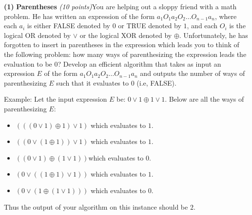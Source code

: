 \documentclass[12pt]{article}
\def\bigap{0.25in}
\begin{document}
\setlength{\parindent}{0in}
\addtolength{\parskip}{0.1cm}
\setlength{\fboxrule}{.5mm}\setlength{\fboxsep}{1.2mm}
\newlength{\boxlength}\setlength{\boxlength}{\textwidth}
\addtolength{\boxlength}{-4mm}
\begin{center}
\end{center}
\vspace{5mm}
\vskip \bigap
{\bf (1)}  \textbf{Parentheses}  {\em (10 points)}\newline You are helping out a sloppy friend with a math problem. He has written an expression of the form $a_1 O_1 a_2 O_2 \ldots O_{n-1} a_n$, where each $a_i$ is either FALSE denoted by $0$ or TRUE denoted by $1$, and each $O_i$ is the logical OR denoted by $\lor$ or  the logical XOR denoted by $\oplus$.  Unfortunately, he has forgotten to insert in parentheses in the expression which leads you to think of the following problem: how many ways of parenthesizing the expression leads the evaluation to be $0$? Develop an efficient algorithm that takes as input an expression $E$ of the form  $a_1 O_1 a_2 O_2 \ldots O_{n-1} a_n$  and outputs the number of ways of parenthesizing $E$ such that it evaluates to $0$ (i.e, FALSE).

Example: Let the input expression $E$ be: $0 \lor 1 \oplus 1 \lor 1$. Below are all the ways of parenthesizing $E$:
\begin{itemize}
 \item $(((0 \lor 1) \oplus 1) \lor 1)$ which evaluates to $1$.
  \item $((0 \lor (1 \oplus 1)) \lor 1)$ which evaluates to $1$.
 \item  $((0 \lor 1) \oplus (1 \lor 1))$which evaluates to $0$.
 \item $(0 \lor ((1 \oplus 1) \lor 1))$ which evaluates to $1$.
 \item $(0 \lor (1 \oplus (1 \lor 1)))$ which evaluates to $0$.
 \end{itemize}
Thus the output of your algorithm on this instance should be $2$.

\vskip \bigap

\end{document}
